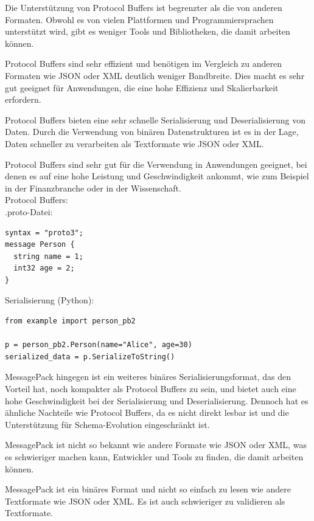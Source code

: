 Die Unterstützung von Protocol Buffers ist begrenzter als die von anderen Formaten. Obwohl es von vielen Plattformen und Programmiersprachen unterstützt wird, gibt es weniger Tools und Bibliotheken, die damit arbeiten können.

Protocol Buffers sind sehr effizient und benötigen im Vergleich zu anderen Formaten wie JSON oder XML deutlich weniger Bandbreite. Dies macht es sehr gut geeignet für Anwendungen, die eine hohe Effizienz und Skalierbarkeit erfordern.

Protocol Buffers bieten eine sehr schnelle Serialisierung und Deserialisierung von Daten. Durch die Verwendung von binären Datenstrukturen ist es in der Lage, Daten schneller zu verarbeiten als Textformate wie JSON oder XML.

Protocol Buffers sind sehr gut für die Verwendung in Anwendungen geeignet, bei denen es auf eine hohe Leistung und Geschwindigkeit ankommt, wie zum Beispiel in der Finanzbranche oder in der Wissenschaft.\\
Protocol Buffers:\\
.proto-Datei:\\
\begin{lstlisting}[caption={Protocol Buffers},captionpos=b,label={lst:buffers}]
syntax = "proto3";
message Person {
  string name = 1;
  int32 age = 2;
}
\end{lstlisting}
Serialisierung (Python):\\
\begin{lstlisting}[caption={Protocol Buffers (Python)},captionpos=b,label={lst:buffers_python}]
from example import person_pb2

p = person_pb2.Person(name="Alice", age=30)
serialized_data = p.SerializeToString()
\end{lstlisting}

MessagePack hingegen ist ein weiteres binäres Serialisierungsformat, das den Vorteil hat, noch kompakter als Protocol Buffers zu sein, und bietet auch eine hohe Geschwindigkeit bei der Serialisierung und Deserialisierung. Dennoch hat es ähnliche Nachteile wie Protocol Buffers, da es nicht direkt lesbar ist und die Unterstützung für Schema-Evolution eingeschränkt ist.

MessagePack ist nicht so bekannt wie andere Formate wie JSON oder XML, was es schwieriger machen kann, Entwickler und Tools zu finden, die damit arbeiten können.

MessagePack ist ein binäres Format und nicht so einfach zu lesen wie andere Textformate wie JSON oder XML. Es ist auch schwieriger zu validieren als Textformate.

